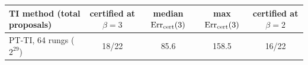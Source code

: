 \begin{tabular}{lcccc}
\toprule
TI method (total proposals) & certified at $\beta{=}3$ & median ${\rm Err}_{\rm cert}(3)$ & max ${\rm Err}_{\rm cert}(3)$ & certified at $\beta{=}2$ \\
\midrule
PT-TI, 64 rungs ($2^{29}$) & 18/22 & 85.6 & 158.5 & 16/22 \\
\bottomrule
\end{tabular}
